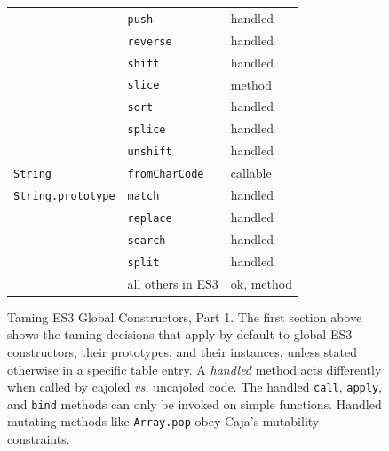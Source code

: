 \documentclass[letterpaper,twocolumn,10pt]{article}
\newcommand{\code}[1]{{\tt {#1}}}              %
\begin{document}
\begin{figure}
\begin{tabular}{lll}
                               & \code{push}                 & handled \\
                               & \code{reverse}              & handled \\
                               & \code{shift}                & handled \\
                               & \code{slice}                & method \\
                               & \code{sort}                 & handled \\
                               & \code{splice}               & handled \\
                               & \code{unshift}              & handled \\
  \hline
  \code{String}                & \code{fromCharCode}         & callable \\
  \code{String.prototype}      & \code{match}                & handled \\
                               & \code{replace}              & handled \\
                               & \code{search}               & handled \\
                               & \code{split}                & handled \\
                               &           all others in ES3 & ok, method \\
\end{tabular}

\caption[Taming ES3 Global Constructors, Part 1.]{Taming ES3 Global 
Constructors, Part 1. The first section above shows the taming decisions that 
apply by default to global ES3 constructors, their prototypes, and their 
instances, unless stated otherwise in a specific table entry. A
\emph{handled} method acts differently when called by cajoled \emph{vs.} 
uncajoled code. The handled \code{call}, \code{apply}, and \code{bind} 
methods can only be invoked on simple functions. Handled mutating methods 
like \code{Array.pop} obey Caja's mutability constraints.}
\label{tab:taming-es3-1}
\end{figure}
\end{document}
